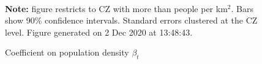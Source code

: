 \begin{figure}[!h]
\centering
\caption{Coefficient on population density $ \beta_t $}
\label{figure:fixed_shares}
  \\ 
\par \begin{minipage}[h]{\textwidth}{\tiny\textbf{Note:} figure restricts to CZ with more than people per km$^2$. Bars show 90\% confidence intervals. Standard errors clustered at the CZ level. Figure generated on  2 Dec 2020 at 13:48:43.}\end{minipage}
\end{figure}

